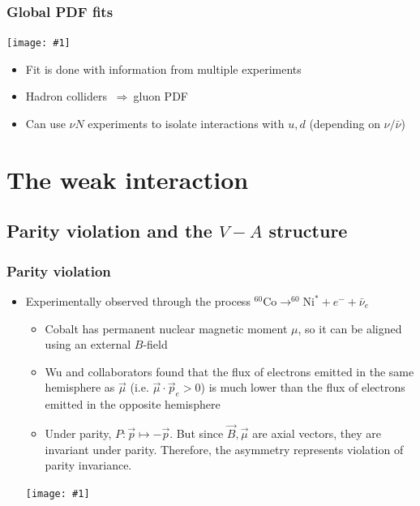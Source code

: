\documentclass[11pt]{article}
\newcommand{\nubar}{{\bar{\nu}}}
\newcommand{\el}{\ensuremath{e^{-}}}
\newcommand{\thus}{\ensuremath{~\Rightarrow~}}
\newcommand{\embedimgw}[2]{\begin{center}\texttt{[image: \#1]}\end{center}}
\begin{document}
\subsubsection{Global PDF fits}
\embedimgw{figs/pdf_global.png}{.5}
\begin{itemize}
  \item Fit is done with information from multiple experiments
  \item Hadron colliders \thus gluon PDF
  \item Can use $\nu N$ experiments to isolate interactions with $u,d$ (depending on $\nu/\nubar$)
\end{itemize}

\section{The weak interaction}
\subsection{Parity violation and the $V-A$ structure}
\subsubsection{Parity violation}
\begin{itemize}
  \item Experimentally observed through the process $^{60}\text{Co}\rightarrow^{60}\text{Ni}^* + \el + \nubar_e$
  \begin{itemize}
    \item Cobalt has permanent nuclear magnetic moment $\mu$, so it can be aligned using an external $B$-field
    \item Wu and collaborators found that the flux of electrons emitted in the same hemisphere as $\vec\mu$ (i.e. $\vec\mu\cdot \vec p_e>0$) is much lower than the flux of electrons emitted in the opposite hemisphere
    \item Under parity, $P:\vec p \mapsto - \vec p$. But since $\vec B,\vec \mu$ are axial vectors, they are invariant under parity. Therefore, the asymmetry represents violation of parity invariance.
  \end{itemize}
  \embedimgw{figs/wu.png}{.4}
\end{itemize}
\end{document}
